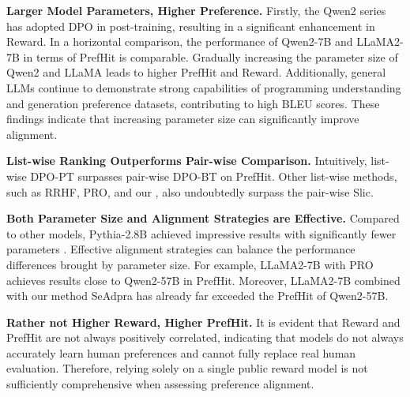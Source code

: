 \textbf{Larger Model Parameters, Higher Preference.}
Firstly, the Qwen2 series has adopted DPO \cite{rafailov2024direct} in post-training, resulting in a significant enhancement in Reward.
In a horizontal comparison, the performance of Qwen2-7B and LLaMA2-7B in terms of PrefHit is comparable.
Gradually increasing the parameter size of Qwen2 \cite{qwen2} and LLaMA leads to higher PrefHit and Reward.
Additionally, general LLMs continue to demonstrate strong capabilities of programming understanding and generation preference datasets, contributing to high BLEU scores.
These findings indicate that increasing parameter size can significantly improve alignment.

\textbf{List-wise Ranking Outperforms Pair-wise Comparison.}
Intuitively, list-wise DPO-PT surpasses pair-wise DPO-{BT} on PrefHit. Other list-wise methods, such as RRHF, PRO, and our \shortname, also undoubtedly surpass the pair-wise Slic.

\textbf{Both Parameter Size and Alignment Strategies are Effective.}
Compared to other models, Pythia-2.8B achieved impressive results with significantly fewer parameters .
Effective alignment strategies can balance the performance differences brought by parameter size. For example, LLaMA2-7B with PRO achieves results close to Qwen2-57B in PrefHit. Moreover, LLaMA2-7B combined with our method SeAdpra has already far exceeded the PrefHit of Qwen2-57B.

\textbf{Rather not Higher Reward, Higher PrefHit.}
It is evident that Reward and PrefHit are not always positively correlated, indicating that models do not always accurately learn human preferences and cannot fully replace real human evaluation. Therefore, relying solely on a single public reward model is not sufficiently comprehensive when assessing preference alignment.

